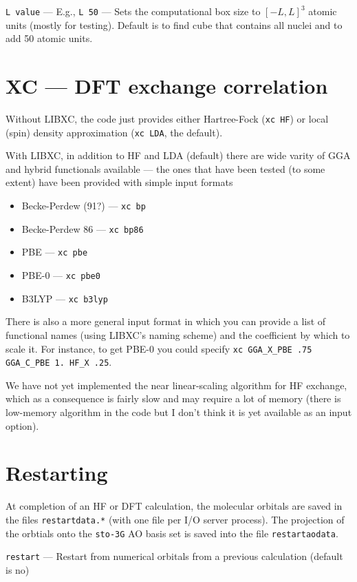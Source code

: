 \documentclass[letterpaper]{book}
\begin{document}
{\tt L value} --- E.g., {\tt L 50} --- Sets the computational box size to $[-L,L]^3$ atomic units (mostly for testing).  Default is to find cube that contains all nuclei and to add 50 atomic units.

\section{XC --- DFT exchange correlation}

Without LIBXC, the code just provides either Hartree-Fock ({\tt xc HF}) or local (spin) density approximation ({\tt xc LDA}, the default).

With LIBXC, in addition to HF and LDA (default) there are wide varity of GGA and hybrid functionals available --- the ones that have been tested (to some extent) have been provided with simple input formats
\begin{itemize}
\item Becke-Perdew (91?) --- \verb+xc bp+
\item Becke-Perdew 86 --- \verb+xc bp86+
\item PBE --- \verb+xc pbe+
\item PBE-0 --- \verb+xc pbe0+
\item B3LYP --- \verb+xc b3lyp+
\end{itemize}

There is also a more general input format in which you can provide a list of functional names (using LIBXC's naming scheme) and the coefficient by which to scale it.  For instance, to get PBE-0 you could specify
\verb+xc GGA_X_PBE .75 GGA_C_PBE 1. HF_X .25+.

We have not yet implemented the near linear-scaling algorithm for HF
exchange, which as a consequence is fairly slow and may require a lot
of memory (there is low-memory algorithm in the code but I don't think
it is yet available as an input option).

\section{Restarting}

At completion of an HF or DFT calculation, the molecular orbitals are
saved in the files \verb+restartdata.*+ (with one file per I/O server
process).  The projection of the orbtials onto the {\tt sto-3G} AO basis
set is saved into the file {\tt restartaodata}.

{\tt restart} --- Restart from numerical orbitals from a previous calculation (default is no)
\end{document}
